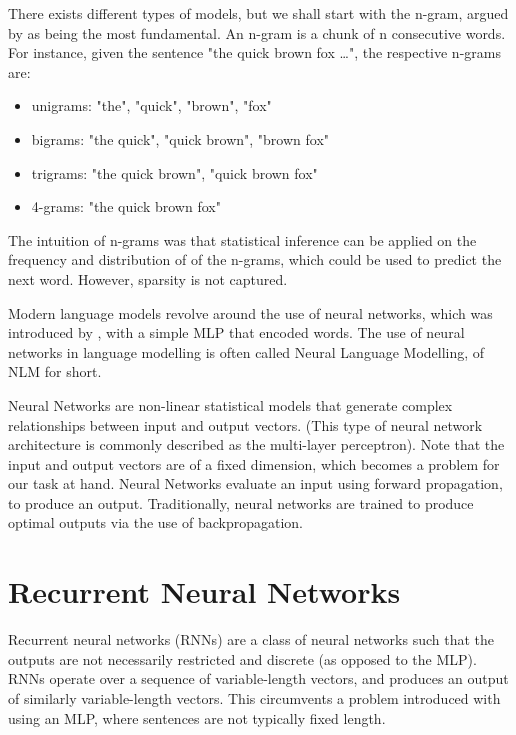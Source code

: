 \documentclass[12pt,twoside]{report}
\begin{document}
There exists different types of models, but we shall start with the n-gram, argued by \cite{le_recurrent_2018} as being the most fundamental. An n-gram is a chunk of n consecutive words. For instance, given the sentence "the quick brown fox \ldots", the respective n-grams are: 

\begin{itemize}  
	\item unigrams: "the", "quick", "brown", "fox"
	\item bigrams: "the quick", "quick brown", "brown fox"
	\item trigrams: "the quick brown", "quick brown fox"
	\item 4-grams: "the quick brown fox"
\end{itemize}

The intuition of n-grams was that statistical inference can be applied on the frequency and distribution of of the n-grams, which could be used to predict the next word. However, sparsity is not captured.


Modern language models revolve around the use of neural networks, which was introduced by \cite{bengio_neural_2001}, with a simple MLP that encoded words. The use of neural networks in language modelling is often called Neural Language Modelling, of NLM for short.

Neural Networks are non-linear statistical models that generate complex relationships between input and output vectors. (This type of neural network architecture is commonly described as the multi-layer perceptron). Note that the input and output vectors are of a fixed dimension, which becomes a problem for our task at hand. Neural Networks evaluate an input using forward propagation, to produce an output. Traditionally, neural networks are trained to produce optimal outputs via the use of backpropagation. 


\section{Recurrent Neural Networks}

Recurrent neural networks (RNNs) are a class of neural networks such that the outputs are not necessarily restricted and discrete (as opposed to the MLP). RNNs operate over a sequence of variable-length vectors, and produces an output of similarly variable-length vectors. This circumvents a problem introduced with using an MLP, where sentences are not typically fixed length. 
\end{document}
